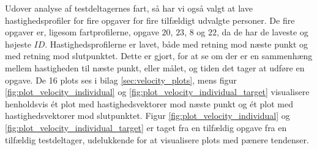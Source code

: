 Udover analyse af testdeltagernes fart, så har vi også valgt at lave hastighedsprofiler for fire opgaver for fire tilfældigt udvalgte personer. De fire opgaver er, ligesom fartprofilerne, opgave $20$, $23$, $8$ og $22$, da de har de laveste og højeste $ID$. Hastighedsprofilerne er lavet, både med retning mod næste punkt og med retning mod slutpunktet. Dette er gjort, for at se om der er en sammenhæng mellem hastigheden til næste punkt, eller målet, og tiden det tager at udføre en opgave. De 16 plots ses i bilag \ref{sec:velocity_plots}, mens figur \ref{fig:plot_velocity_individual} og \ref{fig:plot_velocity_individual_target} visualisere henholdsvis ét plot med hastighedsvektorer mod næste punkt og ét plot med hastighedsvektorer mod slutpunktet. Figur \ref{fig:plot_velocity_individual} og \ref{fig:plot_velocity_individual_target} er taget fra en tilfældig opgave fra en tilfældig testdeltager, udelukkende for at visualisere plots med pænere tendenser. 

